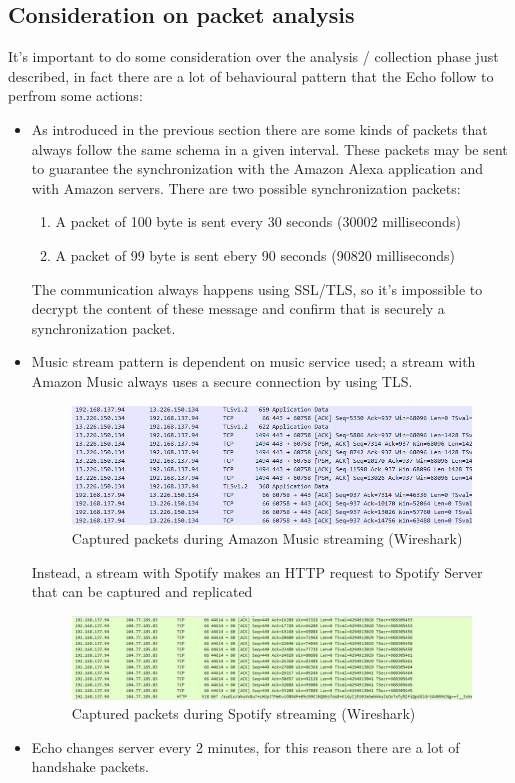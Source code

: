 \documentclass[sigconf]{acmart}
\begin{document}
    \subsection[Consideration on packet]{Consideration on packet analysis}
    It's important to do some consideration over the analysis / collection phase just described, in fact there are a lot of behavioural pattern that the Echo follow to perfrom some actions:
    \begin{itemize}
        \item As introduced in the previous section there are some kinds of packets that always follow the same schema in a given interval.
        These packets may be sent to guarantee the synchronization with the Amazon Alexa application and with Amazon servers.
        There are two possible synchronization packets:
        \begin{enumerate}
            \item A packet of 100 byte is sent every 30 seconds (30002 milliseconds)
            \item A packet of 99 byte is sent ebery 90 seconds (90820 milliseconds)
        \end{enumerate}
        The communication always happens using SSL/TLS, so it's impossible to decrypt the content of these message and confirm that is securely a synchronization packet.
        \item Music stream pattern is dependent on music service used; a stream with Amazon Music always uses a secure connection by using TLS.
        \begin{figure}[h!]
            \centering
            \includegraphics[width=0.8\columnwidth]{img/capture_amazon_music.png}
            \caption{Captured packets during Amazon Music streaming (Wireshark)}
            \label{fig:capture_amazon_music}
        \end{figure}

        Instead, a stream with Spotify makes an HTTP request to Spotify Server that can be captured and replicated
        \begin{figure}[h!]
            \centering
            \includegraphics[width=0.8\columnwidth]{img/capture_spotify.png}
            \caption{Captured packets during Spotify streaming (Wireshark)}
            \label{fig:capture_spotify}
        \end{figure}
        \item Echo changes server every 2 minutes, for this reason there are a lot of handshake packets.
    \end{itemize}
\end{document}

